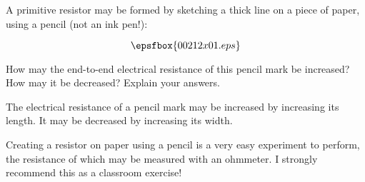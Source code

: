 

A primitive resistor may be formed by sketching a thick line on a piece of paper, using a pencil (not an ink pen!):

$$\epsfbox{00212x01.eps}$$

How may the end-to-end electrical resistance of this pencil mark be increased?  How may it be decreased?  Explain your answers.







The electrical resistance of a pencil mark may be increased by increasing its length.  It may be decreased by increasing its width.







Creating a resistor on paper using a pencil is a very easy experiment to perform, the resistance of which may be measured with an ohmmeter.  I strongly recommend this as a classroom exercise!




